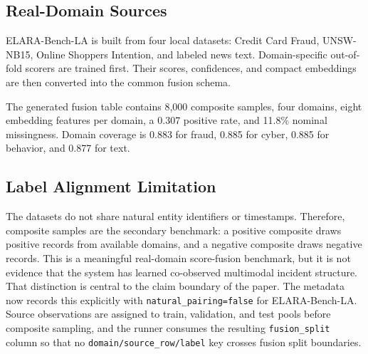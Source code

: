\documentclass[10pt,conference]{IEEEtran}
\newcommand{\benchmark}{ELARA-Bench-LA}
\begin{document}


\subsection{Real-Domain Sources}
\benchmark{} is built from four local datasets: Credit Card Fraud, UNSW-NB15,
Online Shoppers Intention, and labeled news text. Domain-specific out-of-fold
scorers are trained first. Their scores, confidences, and compact embeddings are
then converted into the common fusion schema.

\begin{table}[t]
\centering
\caption{Out-of-fold domain scorer quality used to construct \benchmark.}
\label{tab:domain-scorers}
\footnotesize

\end{table}

The generated fusion table contains 8,000 composite samples, four domains,
eight embedding features per domain, a 0.307 positive rate, and 11.8\% nominal
missingness. Domain coverage is 0.883 for fraud, 0.885 for cyber, 0.885 for
behavior, and 0.877 for text.

\subsection{Label Alignment Limitation}
The datasets do not share natural entity identifiers or timestamps. Therefore,
composite samples are the secondary benchmark: a positive composite draws positive
records from available domains, and a negative composite draws negative records.
This is a meaningful real-domain score-fusion benchmark, but it is not evidence
that the system has learned co-observed multimodal incident structure. That
distinction is central to the claim boundary of the paper. The metadata now
records this explicitly with \texttt{natural\_pairing=false} for \benchmark{}.
Source observations are assigned to train, validation, and test pools before
composite sampling, and the runner consumes the resulting
\texttt{fusion\_split} column so that no \texttt{domain/source\_row/label} key
crosses fusion split boundaries.
\end{document}
